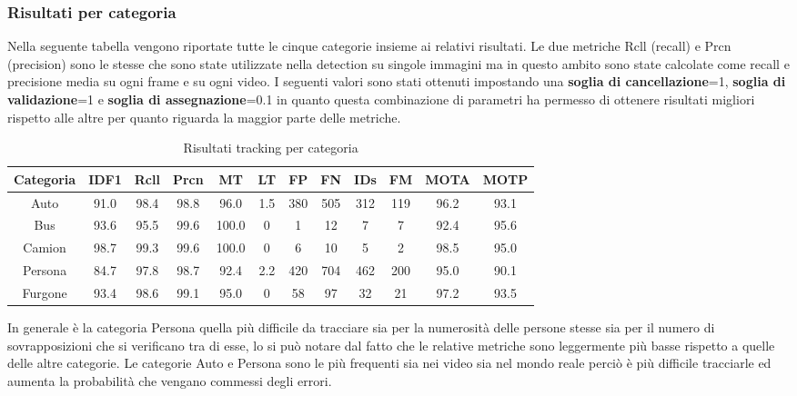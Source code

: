\subsubsection{Risultati per categoria}
Nella seguente tabella vengono riportate tutte le cinque categorie insieme ai relativi risultati. Le due metriche Rcll (recall) e Prcn (precision) sono le stesse che sono state utilizzate nella detection su singole immagini ma in questo ambito sono state calcolate come recall e precisione media su ogni frame e su ogni video. I seguenti valori sono stati ottenuti impostando una \textbf{soglia di cancellazione}=1, \textbf{soglia di validazione}=1 e \textbf{soglia di assegnazione}=0.1 in quanto questa combinazione di parametri ha permesso di ottenere risultati migliori rispetto alle altre per quanto riguarda la maggior parte delle metriche.
\begin{table}[h!]
\centering
\begin{tabular}{|c|c|c|c|c|c|c|c|c|c|c|c|} 
\hline
Categoria & IDF1 & Rcll & Prcn & MT & LT & FP & FN & IDs & FM & MOTA & MOTP\\ [0.5ex] 
\hline
Auto & 91.0 & 98.4 & 98.8 & 96.0 & 1.5 & 380 & 505 & 312 & 119 & 96.2 & 93.1 \\
Bus & 93.6 & 95.5 & 99.6 & 100.0 & 0 & 1 & 12 & 7 & 7 & 92.4 & 95.6 \\
Camion & 98.7 & 99.3 & 99.6 & 100.0 & 0 & 6 & 10 & 5 & 2 & 98.5 & 95.0 \\
Persona & 84.7 & 97.8 & 98.7 & 92.4 & 2.2 & 420 & 704 & 462 & 200 & 95.0 & 90.1 \\
Furgone & 93.4 & 98.6 & 99.1 & 95.0 & 0 & 58 & 97 & 32 & 21 & 97.2 & 93.5\\
\hline
\end{tabular}
\caption{Risultati tracking per categoria}
\label{risultati tracking categoria}
\end{table}
In generale è la categoria Persona quella più difficile da tracciare sia per la numerosità delle persone stesse sia per il numero di sovrapposizioni che si verificano tra di esse, lo si può notare dal fatto che le relative metriche sono leggermente più basse rispetto a quelle delle altre categorie.  Le categorie Auto e Persona sono le più frequenti sia nei video sia nel mondo reale perciò è più difficile tracciarle ed aumenta la probabilità che vengano commessi degli errori.

\clearpage

